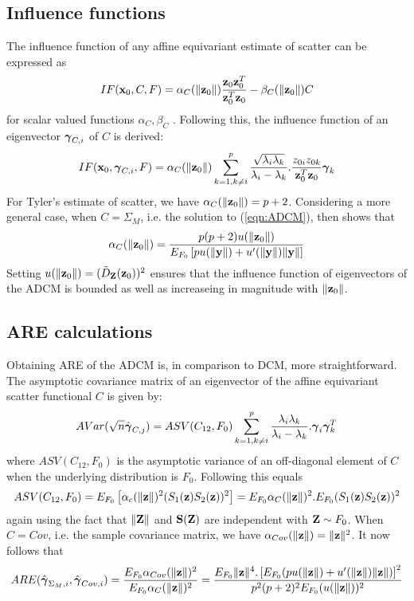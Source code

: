 \documentclass[12pt,letterpaper]{article}
\theoremstyle{definition} \newtheorem{Definition}[Theorem]{Definition}
\begin{document}
\subsection{Influence functions}
The influence function of any affine equivariant estimate of scatter can be expressed as
%
$$
IF({\bf{x}}_0, C, F) = \alpha_C (\| {\bf{z}}_0 \| ) \frac{{\bf{z}}_0 {\bf{z}}_0^T}{{\bf{z}}_0^T {\bf{z}}_0} - \beta_C( \| {\bf{z}}_0 \| ) C
$$
%
for scalar valued functions $\alpha_C, \beta_C$ \citep{HampelBook86}. Following this, the influence function of an eigenvector ${\boldsymbol{\gamma}}_{C,i}$ of $C$ is derived:
%
$$
IF({\bf{x}}_0, {\boldsymbol{\gamma}}_{C,i}, F) = \alpha_C(\| {\bf{z}}_0 \|) \sum_{k=1, k \neq i}^p \frac{\sqrt {\lambda_i \lambda_k}}{\lambda_i - \lambda_k}. \frac{z_{0i} z_{0k}}{{\bf{z}}_0^T {\bf{z}}_0} {\boldsymbol{\gamma}}_k
$$
%
For Tyler's estimate of scatter, we have $\alpha_C (\| {\bf{z}}_0 \|) = p+2$. Considering a more general case, when $C=\Sigma_M$, i.e. the solution to (\ref{eqn:ADCM}), then \cite{HuberBook81} shows that
%
$$
\alpha_C (\| {\bf{z}}_0 \|) = \frac{p(p+2) u (\| {\bf{z}}_0 \|)}{E_{F_0} \left[ p u(\| {\bf{y}} \| ) + u'(\| {\bf{y}} \|) \| {\bf{y}} \| \right] }
$$
%
Setting $u( \| {\bf{z}}_0 \|) = ( \tilde D_{\mathbf{Z}} ({\bf{z}}_0))^2$ ensures that the influence function of eigenvectors of the ADCM is bounded as well as increaseing in magnitude with $\| {\bf{z}}_0 \|$.

\subsection{ARE calculations}

Obtaining ARE of the ADCM is, in comparison to DCM, more straightforward. The asymptotic covariance matrix of an eigenvector of the affine equivariant scatter functional $C$ is given by:
%
$$
AVar (\sqrt n  \hat{{\boldsymbol{\gamma}}}_{C,j}) = ASV (C_{12}, F_0) \sum_{k=1, k \neq i}^p \frac{\lambda_i \lambda_k}{\lambda_i - \lambda_k}. {\boldsymbol{\gamma}}_i {\boldsymbol{\gamma}}_k^T
$$
%
where $ASV (C_{12}, F_0)$ is the asymptotic variance of an off-diagonal element of $C$ when the underlying distribution is $F_0$. Following \cite{croux00} this equals
%
$$
ASV (C_{12}, F_0) = E_{F_0} \left[ \alpha_c (\| {\bf{z}} \|)^2 (S_1({\bf{z}})S_2 ({\bf{z}}))^2 \right] = E_{F_0} \alpha_C (\| {\bf{z}} \|)^2 . E_{F_0} (S_1({\bf{z}})S_2 ({\bf{z}}))^2 
$$
% 
again using the fact that $\|{\mathbf{Z}}\|$ and ${\mathbf{S}}({\mathbf{Z}})$ are independent with ${\mathbf{Z}} \sim F_0$. When $C = Cov$, i.e. the sample covariance matrix, we have $\alpha_{Cov} (\| {\bf{z}} \|) = \| {\bf{z}} \|^2$. It now follows that
%
\begin{equation}
ARE (\hat{{\boldsymbol{\gamma}}}_{\Sigma_M,i}, \hat{{\boldsymbol{\gamma}}}_{Cov,i}) = \frac{E_{F_0} \alpha_{Cov} (\| {\bf{z}} \|)^2}{E_{F_0} \alpha_C (\| {\bf{z}} \|)^2} = \frac{E_{F_0} \| {\bf{z}} \|^4. \left[ E_{F_0} ( p u (\| {\bf{z}}\|) + u'( \| {\bf{z}} \|) \| {\bf{z}} \| ) \right]^2}{p^2 (p+2)^2 E_{F_0} (u(\| {\bf{z}} \|))^2}
\end{equation}
%
\end{document}
